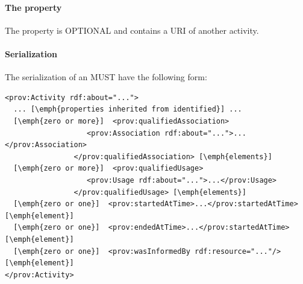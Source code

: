 {\paragraph{The  property}\label{sec:wasInformedBys}
The  property is OPTIONAL and contains a URI of another activity.

\paragraph{Serialization}
The serialization of an  MUST have the following form:
}

\begin{lstlisting}
<prov:Activity rdf:about="...">
  ... [\emph{properties inherited from identified}] ...
  [\emph{zero or more}]  <prov:qualifiedAssociation>
                   <prov:Association rdf:about="...">...</prov:Association>
                </prov:qualifiedAssociation> [\emph{elements}]
  [\emph{zero or more}]  <prov:qualifiedUsage>
                   <prov:Usage rdf:about="...">...</prov:Usage>
                </prov:qualifiedUsage> [\emph{elements}]             
  [\emph{zero or one}]  <prov:startedAtTime>...</prov:startedAtTime> [\emph{element}]
  [\emph{zero or one}]  <prov:endedAtTime>...</prov:startedAtTime> [\emph{element}] 
  [\emph{zero or one}]  <prov:wasInformedBy rdf:resource="..."/> [\emph{element}] 
</prov:Activity>
\end{lstlisting}


